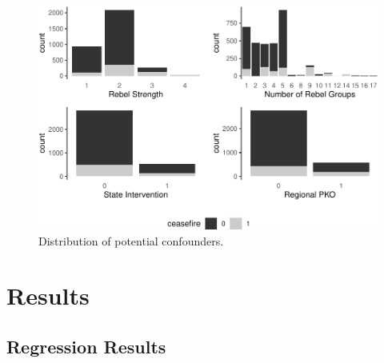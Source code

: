 \documentclass[12pt,english,a4paper,oneside]{article}
\begin{document}
\begin{figure}[H]
\includegraphics[width=\textwidth]{figs/desc-conf-1} \caption[Distribution of potential confounders]{Distribution of potential confounders.}\label{fig:desc-conf}
\end{figure}

\hypertarget{results}{%
\section{Results}\label{results}}

\hypertarget{regression-results}{%
\subsection{Regression Results}\label{regression-results}}
\end{document}
